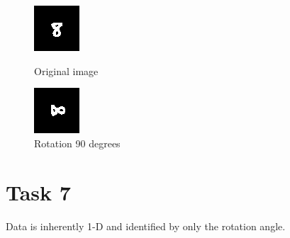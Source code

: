 \documentclass[11pt]{article}
\theoremstyle{plain}
\theoremstyle{definition}
\begin{document}
\begin{figure}[!htb]
   \begin{minipage}{0.48\textwidth}
     \centering
     \includegraphics[width=.7\linewidth]{original.png}
     \caption{Original image}\label{Fig:Original image}
   \end{minipage}\hfill
   \begin {minipage}{0.48\textwidth}
     \centering
     \includegraphics[width=.7\linewidth]{Task6.png}
     \caption{Rotation 90 degrees}\label{Fig:Rotate 90 degrees}
   \end{minipage}\hfill 
\end{figure} 


\section{Task 7}
Data is inherently 1-D and identified by only the rotation angle. 
\end{document}
